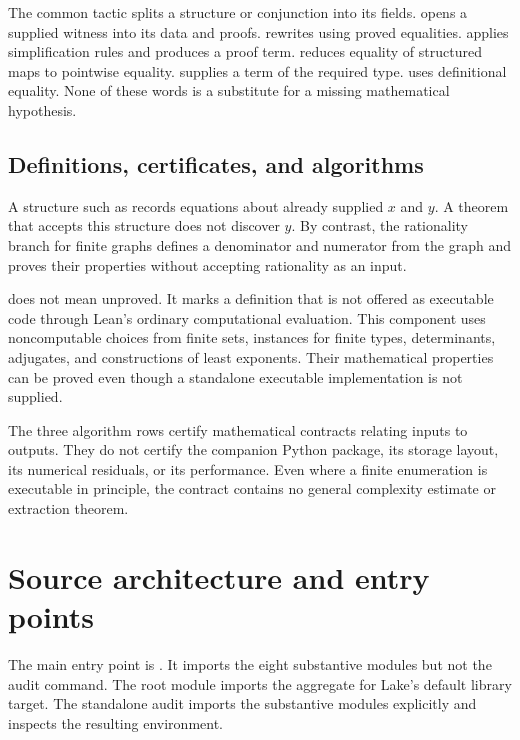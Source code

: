 The common  tactic splits a structure or conjunction into its fields.  opens a supplied witness into its data and proofs.  rewrites using proved equalities.  applies simplification rules and produces a proof term.  reduces equality of structured maps to pointwise equality.  supplies a term of the required type.  uses definitional equality. None of these words is a substitute for a missing mathematical hypothesis.

\subsection{Definitions, certificates, and algorithms}

A structure such as  records equations about already supplied $x$ and $y$. A theorem that accepts this structure does not discover $y$. By contrast, the rationality branch for finite graphs defines a denominator and numerator from the graph and proves their properties without accepting rationality as an input.

 does not mean unproved. It marks a definition that is not offered as executable code through Lean's ordinary computational evaluation. This component uses noncomputable choices from finite sets, instances for finite types, determinants, adjugates, and constructions of least exponents. Their mathematical properties can be proved even though a standalone executable implementation is not supplied.

The three algorithm rows certify mathematical contracts relating inputs to outputs. They do not certify the companion Python package, its storage layout, its numerical residuals, or its performance. Even where a finite enumeration is executable in principle, the contract contains no general complexity estimate or extraction theorem.

\section{Source architecture and entry points}\label{sec:architecture}

The main entry point is . It imports the eight substantive modules but not the audit command. The root module  imports the aggregate for Lake's default library target. The standalone audit imports the substantive modules explicitly and inspects the resulting environment.

